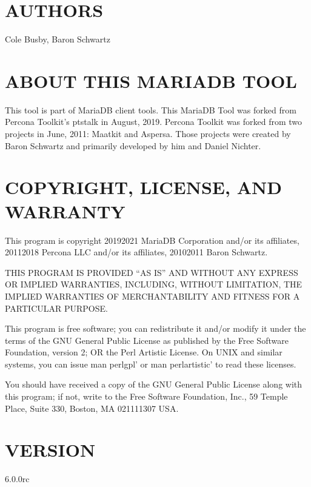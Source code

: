 \documentclass[letterpaper,10pt,english]{sphinxmanual}
\begin{document}
\section{AUTHORS}
\label{\detokenize{mariadb-stat-browser:authors}}
Cole Busby, Baron Schwartz


\section{ABOUT THIS MARIADB TOOL}
\label{\detokenize{mariadb-stat-browser:about-this-mariadb-tool}}
This tool is part of MariaDB client tools. This MariaDB Tool was forked from
Percona Toolkit’s pt\sphinxhyphen{}stalk in August, 2019. Percona Toolkit was forked from two
projects in June, 2011: Maatkit and Aspersa.  Those projects were created by
Baron Schwartz and primarily developed by him and Daniel Nichter.


\section{COPYRIGHT, LICENSE, AND WARRANTY}
\label{\detokenize{mariadb-stat-browser:copyright-license-and-warranty}}
This program is copyright 2019\sphinxhyphen{}2021 MariaDB Corporation and/or its affiliates,
2011\sphinxhyphen{}2018 Percona LLC and/or its affiliates, 2010\sphinxhyphen{}2011 Baron Schwartz.

THIS PROGRAM IS PROVIDED “AS IS” AND WITHOUT ANY EXPRESS OR IMPLIED
WARRANTIES, INCLUDING, WITHOUT LIMITATION, THE IMPLIED WARRANTIES OF
MERCHANTABILITY AND FITNESS FOR A PARTICULAR PURPOSE.

This program is free software; you can redistribute it and/or modify it under
the terms of the GNU General Public License as published by the Free Software
Foundation, version 2; OR the Perl Artistic License.  On UNIX and similar
systems, you can issue \textasciigrave{}man perlgpl’ or \textasciigrave{}man perlartistic’ to read these
licenses.

You should have received a copy of the GNU General Public License along with
this program; if not, write to the Free Software Foundation, Inc., 59 Temple
Place, Suite 330, Boston, MA  02111\sphinxhyphen{}1307  USA.


\section{VERSION}
\label{\detokenize{mariadb-stat-browser:version}}
 6.0.0rc
\end{document}
